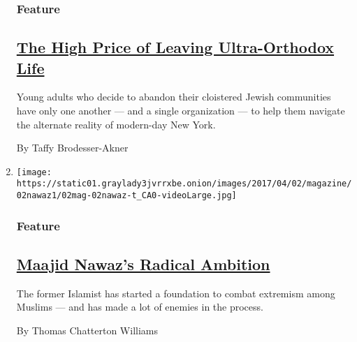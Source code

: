\begin{enumerate}
  \hypertarget{feature-2}{%
  \subsubsection{Feature}\label{feature-2}}

  \hypertarget{the-high-price-of-leaving-ultra-orthodox-life}{%
  \subsection{\texorpdfstring{\href{/2017/03/30/magazine/the-high-price-of-leaving-ultra-orthodox-life.html}{The
  High Price of Leaving Ultra-Orthodox
  Life}}{The High Price of Leaving Ultra-Orthodox Life}}\label{the-high-price-of-leaving-ultra-orthodox-life}}

  Young adults who decide to abandon their cloistered Jewish communities
  have only one another --- and a single organization --- to help them
  navigate the alternate reality of modern-day New York.

  By Taffy Brodesser-Akner
\item
  \texttt{[image: https://static01.graylady3jvrrxbe.onion/images/2017/04/02/magazine/02nawaz1/02mag-02nawaz-t\_CA0-videoLarge.jpg]}

  \hypertarget{feature-3}{%
  \subsubsection{Feature}\label{feature-3}}

  \hypertarget{maajid-nawazs-radical-ambition}{%
  \subsection{\texorpdfstring{\href{/2017/03/28/magazine/can-a-former-islamist-make-it-cool-to-be-moderate.html}{Maajid
  Nawaz's Radical
  Ambition}}{Maajid Nawaz's Radical Ambition}}\label{maajid-nawazs-radical-ambition}}

  The former Islamist has started a foundation to combat extremism among
  Muslims --- and has made a lot of enemies in the process.

  By Thomas Chatterton Williams
\end{enumerate}


